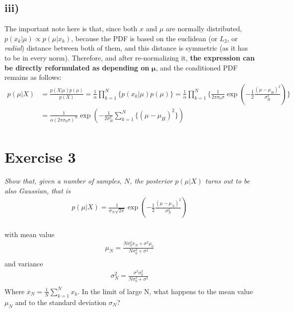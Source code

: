 \documentclass[11pt]{scrartcl} %
\begin{document}
         \subsection*{iii)}
         The important note here is that, since both \(x\) and \(\mu\) are normally distributed, \(p(x_k|\mu)\propto p(\mu|x_k)\), because the PDF is based on the euclidean (or \(L_2\), or {\it radial}) distance between both of them, and this distance is symmetric (as it has to be in every norm). Therefore, and after re-normalizing it, \textbf{the expression can be directly reformulated as depending on} \(\boldsymbol{\mu}\), and the conditioned PDF remains as follows:
         \begin{equation}\label{eq:2}
           \begin{split}
             p(\mu|X) &= \frac{p(X|\mu)p(\mu)}{p(X)} = \frac{1}{\alpha}\prod_{k=1}^N\{p(x_k|\mu)p(\mu)\} = \frac{1}{\alpha}\prod_{k=1}^N \{\frac{1}{2\pi\sigma_0\sigma}\exp\left(-\frac{1}{2}\frac{(\mu-\mu_H)^2}{\sigma_H^2}\right)\}\\
             &= \frac{1}{\alpha(2\pi\sigma_0\sigma)^N}\exp\left(-\frac{1}{2\sigma_H^2}\sum_{k=1}^N\{(\mu-\mu_H)^2\}\right)\\
           \end{split}
         \end{equation}


         \vspace{5mm}
\section*{Exercise 3}
         {\it Show that, given a number of samples, \(N\), the posterior \(p(\mu|X)\) turns out to be also Gaussian, that is
           \begin{align*}
             p(\mu|X) = \frac{1}{\sigma_N\sqrt{2\pi}} \exp\left(-\frac{1}{2}\frac{(\mu-\mu_N)^2}{\sigma_N^2}\right)\\
           \end{align*}

           with mean value
           \begin{align*}
             \mu_{N} = \frac{N\sigma_0^2\overline{x}_N+\sigma^2\mu_0}{N\sigma_0^2+\sigma^2}\\
           \end{align*}
           and variance
           \begin{align*}
             \sigma_{N}^2 = \frac{\sigma^2\sigma_0^2}{N\sigma_0^2+\sigma^2}\\
           \end{align*}
           Where \(\overline{x}_N=\frac{1}{N}\sum_{k=1}^N x_k\). In the limit of large N, what happens to the mean value \(\mu_N\) and to the standard deviation \(\sigma_N\)?}
\end{document}
